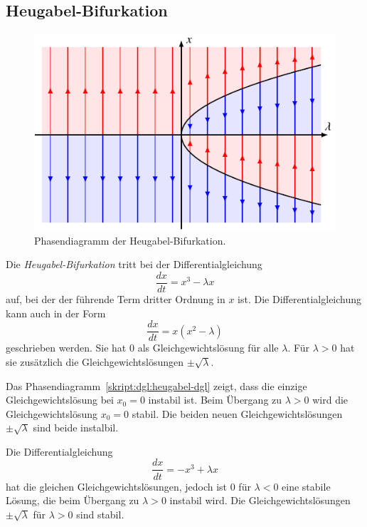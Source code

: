 \subsection{Heugabel-Bifurkation}
\begin{figure}
\centering
\includegraphics{chapters/3/pitchfork.pdf}
\caption{Phasendiagramm der Heugabel-Bifurkation.
\label{skript:dgl:pitchfork}}
\end{figure}
Die {\em Heugabel-Bifurkation} tritt bei der Differentialgleichung
\begin{equation}
\frac{dx}{dt} = x^3 - \lambda x
\label{skript:dgl:heugabel-dgl}
\end{equation}
auf, bei der der führende Term
dritter Ordnung in $x$ ist.
Die Differentialgleichung
kann auch in der Form
\[
\frac{dx}{dt}
=
x(x^2-\lambda)
\]
geschrieben werden.
Sie hat $0$ als Gleichgewichtslösung für alle $\lambda$.
Für $\lambda>0$ hat sie zusätzlich die Gleichgewichtslösungen
$\pm\sqrt{\lambda}$.

Das Phasendiagramm~\ref{skript:dgl:heugabel-dgl} zeigt, dass
die einzige Gleichgewichtslösung bei $x_0=0$ instabil ist.
Beim Übergang zu $\lambda>0$ wird die Gleichgewichtslösung $x_0=0$
stabil.
Die beiden neuen Gleichgewichtslösungen $\pm\sqrt{\lambda}$ sind
beide instalbil.

Die Differentialgleichung
\[
\frac{dx}{dt} = -x^3+\lambda x
\]
hat die gleichen Gleichgewichtslösungen, jedoch ist $0$ für
$\lambda<0$ eine stabile Lösung, die beim Übergang zu $\lambda>0$
instabil wird.
Die Gleichgewichtslösungen $\pm\sqrt{\lambda}$ für $\lambda >0$
sind stabil.

